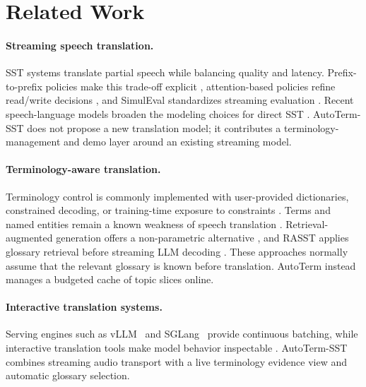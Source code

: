 \section{Related Work}

\paragraph{Streaming speech translation.}
SST systems translate partial speech while balancing quality and latency.
Prefix-to-prefix policies make this trade-off explicit
\citep{ma2019stacl}, attention-based policies refine read/write decisions
\citep{papi2023alignatt,papi2024streamatt}, and SimulEval standardizes
streaming evaluation \citep{ma2020simuleval}. Recent speech-language models
broaden the modeling choices for direct SST
\citep{seamless2023,zhang2024streamspeech,xu2025qwen3omni}. AutoTerm-SST does
not propose a new translation model; it contributes a terminology-management
and demo layer around an existing streaming model.

\paragraph{Terminology-aware translation.}
Terminology control is commonly implemented with user-provided dictionaries,
constrained decoding, or training-time exposure to constraints
\citep{hokamp2017lexically,dinu2019training}. Terms and named entities remain a
known weakness of speech translation \citep{gaido2021moby}. Retrieval-augmented
generation offers a non-parametric alternative
\citep{lewis2020retrieval,khandelwal2021nearest}, and RASST applies glossary
retrieval before streaming LLM decoding \citep{luo2026rasst}. These approaches
normally assume that the relevant glossary is known before translation.
AutoTerm instead manages a budgeted cache of topic slices online.

\paragraph{Interactive translation systems.}
Serving engines such as vLLM~\citep{kwon2023efficient} and
SGLang~\citep{zheng2024sglang} provide continuous batching, while interactive translation tools
make model behavior inspectable \citep{dandekar2024translation}. AutoTerm-SST
combines streaming audio transport with a live terminology evidence view and
automatic glossary selection.
